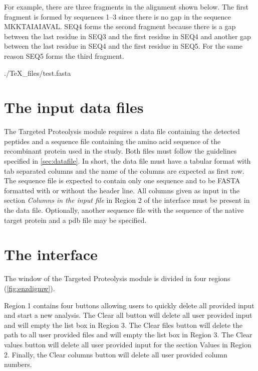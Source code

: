 For example, there are three fragments in the alignment shown below. The first fragment is formed by sequences \numrange{1}{3} since there is no gap in the sequence MKKTAIAIAVAL. SEQ\num{4} forms the second fragment because there is a gap between the last residue in SEQ\num{3} and the first residue in SEQ\num{4} and another gap between the last residue in SEQ\num{4} and the first residue in SEQ\num{5}. For the same reason SEQ\num{5} forms the third fragment.

\begin{texshade}{./TeX_files/test.fasta}
	\hideconsensus
\end{texshade}

\section{The input data files}

The Targeted Proteolysis module requires a data file containing the detected peptides and a sequence file containing the amino acid sequence of the recombinant protein used in the study. Both files must follow the guidelines specified in \autoref{sec:datafile}. In short, the data file must have a tabular format with tab separated columns and the name of the columns are expected as first row. The sequence file is expected to contain only one sequence and to be FASTA formatted with or without the header line. All columns given as input in the section \textit{Columns in the input file} in Region \num{2} of the interface must be present in the data file. Optionally, another sequence file with the sequence of the native target protein and a pdb file may be specified.

\section{The interface}

The window of the Targeted Proteolysis module is divided in four regions (\autoref{fig:enzdigmw}). 

Region \num{1} contains four buttons allowing users to quickly delete all provided input and start a new analysis. The Clear all button will delete all user provided input and will empty the list box in Region \num{3}. The Clear files button will delete the path to all user provided files and will empty the list box in Region \num{3}. The Clear values button will delete all user provided input for the section Values in Region \num{2}. Finally, the Clear columns button will delete all user provided column numbers. 

